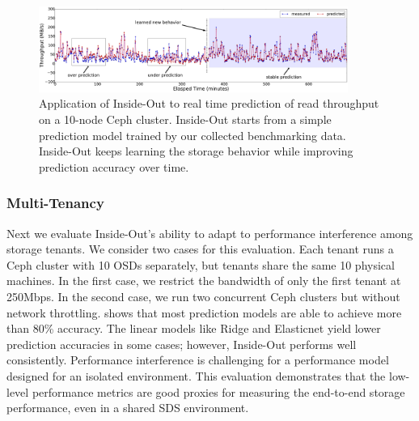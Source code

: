 \begin{figure}
    \centering
    \includegraphics[width=0.9\textwidth]{Chapter-InsideOut/figures/real-world_tp_read.pdf}
    \caption{Application of Inside-Out to real time prediction of read throughput on a 10-node Ceph cluster.  Inside-Out starts from a simple prediction model trained by our collected benchmarking data.  Inside-Out keeps learning the storage behavior while improving prediction accuracy over time.}
    \label{fig:real_workload}
\end{figure}


\subsubsection{Multi-Tenancy}
 
Next we evaluate Inside-Out's ability to adapt to performance interference among storage tenants.
We consider two cases for this evaluation. 
Each tenant runs a Ceph cluster with 10 OSDs separately, but tenants share the same 10 physical machines.
In the first case, we restrict the bandwidth of only the first tenant at 250Mbps.
In the second case, we run two concurrent Ceph clusters but without network throttling.
\myfigure{\ref{fig:multi_tenancy}} shows that most prediction models are able to achieve more than 80\% accuracy.
The linear models like Ridge and Elasticnet yield lower prediction accuracies in some cases; however, Inside-Out performs well consistently.
Performance interference is challenging for a performance model designed for an isolated environment.
This evaluation demonstrates that the low-level performance metrics are good proxies for measuring
the end-to-end storage performance, even in a shared SDS environment.




